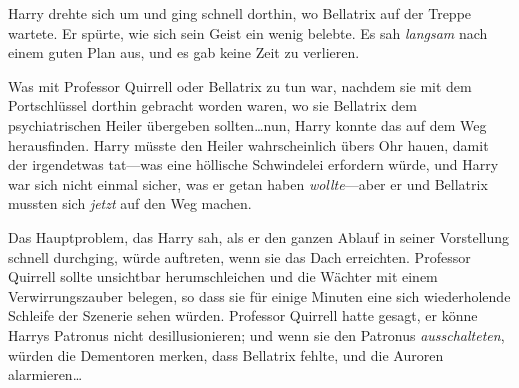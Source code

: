 Harry drehte sich um und ging schnell dorthin, wo Bellatrix auf der Treppe wartete. Er spürte, wie sich sein Geist ein wenig belebte. Es sah \emph{langsam} nach einem guten Plan aus, und es gab keine Zeit zu verlieren.

Was mit Professor Quirrell oder Bellatrix zu tun war, nachdem sie mit dem Portschlüssel dorthin gebracht worden waren, wo sie Bellatrix dem psychiatrischen Heiler übergeben sollten…nun, Harry konnte das auf dem Weg herausfinden. Harry müsste den Heiler wahrscheinlich übers Ohr hauen, damit der irgendetwas tat—was eine höllische Schwindelei erfordern würde, und Harry war sich nicht einmal sicher, was er getan haben \emph{wollte}—aber er und Bellatrix mussten sich \emph{jetzt} auf den Weg machen.

Das Hauptproblem, das Harry sah, als er den ganzen Ablauf in seiner Vorstellung schnell durchging, würde auftreten, wenn sie das Dach erreichten. Professor Quirrell sollte unsichtbar herumschleichen und die Wächter mit einem Verwirrungszauber belegen, so dass sie für einige Minuten eine sich wiederholende Schleife der Szenerie sehen würden. Professor Quirrell hatte gesagt, er könne Harrys Patronus nicht desillusionieren; und wenn sie den Patronus \emph{ausschalteten}, würden die Dementoren merken, dass Bellatrix fehlte, und die Auroren alarmieren…%

